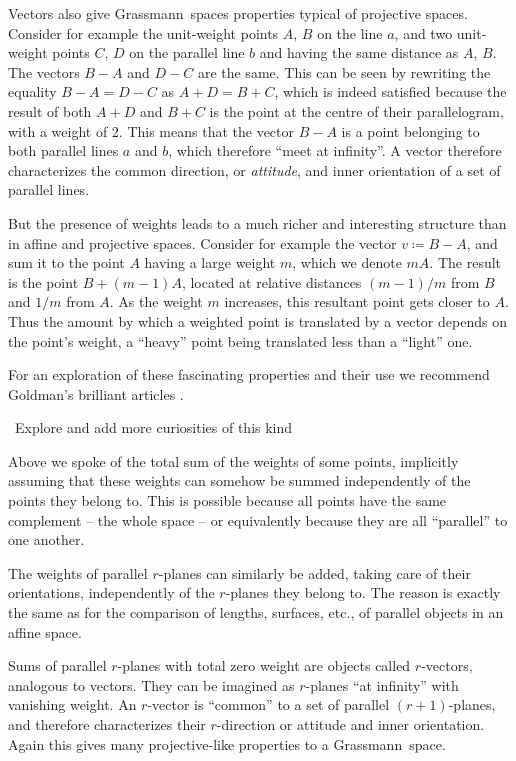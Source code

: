 \documentclass[\ifafour a4paper,12pt,\else a5paper,10pt,\fi%
onecolumn,oneside,article,%
british%
]{memoir}
\theoremstyle{remark}
\theoremstyle{innote}
\newcommand*{\defd}{\coloneqq}
\renewcommand*{\|}{\nonscript\,\vert\nonscript\;\mathopen{}}
\newcommand*{\etc}{{etc.}}
\newcommand*{\puzzle}{{\fontencoding{U}\fontfamily{fontawesometwo}\selectfont\symbol{225}}}
\newcommand{\mynote}[1]{ {\color{notecolour}\puzzle\ #1}}
\newcommand*{\gm}{Grassmann}
\newcommand*{\yr}{r}
\newcommand*{\ym}{m}
\newcommand*{\ya}{a}
\newcommand*{\yb}{b}
\begin{document}
Vectors also give \gm\ spaces properties typical of projective spaces.
Consider for example the unit-weight points $A$, $B$ on the line $\ya$, and
two unit-weight points $C$, $D$ on the parallel line $\yb$ and having the
same distance as $A$, $B$. The vectors $B-A$ and $D-C$ are the same. This
can be seen by rewriting the equality $B-A = D-C$ as $A+D = B+C$, which is
indeed satisfied because the result of both $A+D$ and $B+C$ is the point at
the centre of their parallelogram, with a weight of $2$. This means that
the vector $B-A$ is a point belonging to both parallel lines $\ya$ and
$\yb$, which therefore \enquote{meet at infinity}. A vector therefore
characterizes the common direction, or \emph{attitude}, and inner
orientation of a set of parallel lines.

But the presence of weights leads to a much richer and interesting
structure than in affine and projective spaces. Consider for example the
vector $v \defd B-A$, and sum it to the point $A$ having a large weight
$\ym$, which we denote $\ym A$. The result is the point $B+(\ym-1)A$,
located at relative distances $(\ym-1)/\ym$ from $B$ and $1/\ym$ from $A$.
As the weight $\ym$ increases, this resultant point gets closer to $A$.
Thus the amount by which a weighted point is translated by a vector depends
on the point's weight, a \enquote{heavy} point being translated less than a
\enquote{light} one.

For an exploration of these fascinating properties and their use we
recommend Goldman's brilliant articles \cite{goldman2000,goldman2002}.

\mynote{Explore and add more curiosities of this kind}


\medskip

Above we spoke of the total sum of the weights of some points, implicitly
assuming that these weights can somehow be summed independently of the
points they belong to. This is possible because all points have the same
complement -- the whole space -- or equivalently because they are all
\enquote{parallel} to one another.

The weights of parallel $\yr$-planes can similarly be added, taking care of
their orientations, independently of the $\yr$-planes they belong to. The
reason is exactly the same as for the comparison of lengths, surfaces,
\etc, of parallel objects in an affine space.

Sums of parallel $\yr$-planes with total zero weight are objects called
$\yr$-vectors, analogous to vectors. They can be imagined as $\yr$-planes
\enquote{at infinity} with vanishing weight. An $\yr$-vector is
\enquote{common} to a set of parallel $(\yr+1)$-planes, and therefore
characterizes their $\yr$-direction or attitude and inner orientation.
Again this gives many projective-like properties to a \gm\ space.
\end{document}
